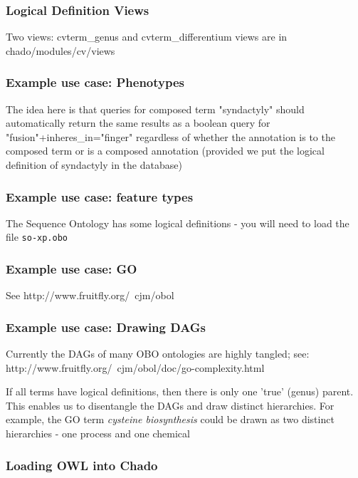 \subsubsection{Logical Definition Views}

Two views: cvterm\_genus and cvterm\_differentium views are in
chado/modules/cv/views 

\subsubsection{Example use case: Phenotypes}

The idea here is that queries for composed term "syndactyly" should
automatically return the same results as a boolean query for
"fusion"+inheres_in="finger" regardless of whether the annotation is
to the composed term or is a composed annotation (provided we put the
logical definition of syndactyly in the database)

\subsubsection{Example use case: feature types}

The Sequence Ontology has some logical definitions - you will need to
load the file {\tt so-xp.obo}

\subsubsection{Example use case: GO}

See
http://www.fruitfly.org/~cjm/obol

\subsubsection{Example use case: Drawing DAGs}

Currently the DAGs of many OBO ontologies are highly tangled; see:
http://www.fruitfly.org/~cjm/obol/doc/go-complexity.html

If all terms have logical definitions, then there is only one 'true'
(genus) \isa parent. This enables us to disentangle the DAGs and draw
distinct hierarchies. For example, the GO term {\em cysteine
biosynthesis} could be drawn as two distinct hierarchies - one process
and one chemical

\subsubsection{Loading OWL into Chado}

